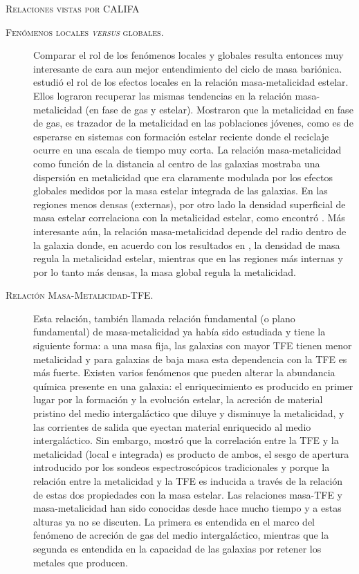 \documentclass[xcolor=dvipsnames,4pt,hyperref={colorlinks,citecolor=black,linkcolor=black,urlcolor=black}]{beamer}
\begin{document}
\begin{frame}[allowframebreaks]{\textsc{Relaciones vistas por CALIFA}}
\begin{description}
\item[\textsc{Fenómenos locales \emph{versus} globales.}] Comparar el rol de los fenómenos locales y
globales resulta entonces muy interesante de cara aun mejor entendimiento del ciclo de masa
bariónica. \citet{Gonzalez2014b} estudió el rol de los efectos locales en la relación
masa-metalicidad estelar. Ellos lograron recuperar las mismas tendencias en la relación
masa-metalicidad (en fase de gas y estelar). Mostraron que la metalicidad en fase de gas, es
trazador de la metalicidad en las poblaciones jóvenes, como es de esperarse en sistemas con
formación estelar reciente donde el reciclaje ocurre en una escala de tiempo muy corta.
La relación masa-metalicidad como función de la distancia al centro de las galaxias mostraba una
dispersión en metalicidad que era claramente modulada por los efectos globales medidos por la masa
estelar integrada de las galaxias. En las regiones menos densas (externas), por otro lado la
densidad superficial de masa estelar correlaciona con la metalicidad estelar, como encontró
\citet{Sanchez2013}. Más interesante aún, la relación masa-metalicidad depende del radio dentro de
la galaxia donde, en acuerdo con los resultados en \citet{Gonzalez2014a}, la densidad de masa regula
la metalicidad estelar, mientras que en las regiones más internas y por lo tanto más densas, la masa
global regula la metalicidad.

\item[\textsc{Relación Masa-Metalicidad-TFE.}] Esta relación, también llamada relación fundamental
(o plano fundamental) de masa-metalicidad ya había sido estudiada \citep{Lara-Lopez2010,
Mannucci2010} y tiene la siguiente forma: a una masa fija, las galaxias con mayor TFE tienen menor
metalicidad y para galaxias de baja masa esta dependencia con la TFE es más fuerte. Existen varios
fenómenos que pueden alterar la abundancia química presente en una galaxia: el enriquecimiento es
producido en primer lugar por la formación y la evolución estelar, la acreción de material pristino
del medio intergaláctico que diluye y disminuye la metalicidad, y las corrientes de salida que
eyectan material enriquecido al medio intergaláctico.
Sin embargo, \citet{Sanchez2013} mostró que la correlación entre la TFE y la metalicidad (local e
integrada) es producto de ambos, el sesgo de apertura introducido por los sondeos espectroscópicos
tradicionales y porque la relación entre la metalicidad y la TFE es inducida a través de la relación
de estas dos propiedades con la masa estelar. Las relaciones masa-TFE y masa-metalicidad han sido
conocidas desde hace mucho tiempo y a estas alturas ya no se discuten. La primera es entendida en el
marco del fenómeno de acreción de gas del medio intergaláctico, mientras que la segunda es entendida
en la capacidad de las galaxias por retener los metales que producen.


\end{description}
\end{frame}
\end{document}
